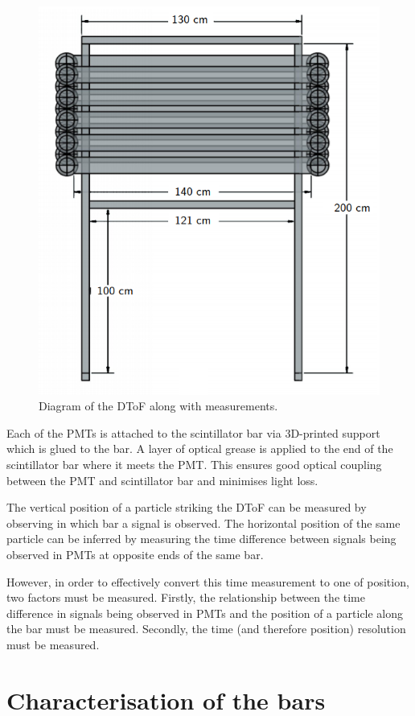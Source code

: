 \begin{figure}[h]
  \centering
  \includegraphics[width=.5\linewidth]{files/figures/hptpc_dtof_characterisation/dstofFront}
  \caption[Diagram of the HPTPC DToF]{Diagram of the DToF along with measurements.}
  \label{fig:dtofDiag}
\end{figure}

Each of the PMTs is attached to the scintillator bar via 3D-printed support which is glued to the bar.
A layer of optical grease is applied to the end of the scintillator bar where it meets the PMT.
This ensures good optical coupling between the PMT and scintillator bar and minimises light loss.

The vertical position of a particle striking the DToF can be measured by observing in which bar a signal is observed.
The horizontal position of the same particle can be inferred by measuring the time difference between signals being observed in PMTs at opposite ends of the same bar.

However, in order to effectively convert this time measurement to one of position, two factors must be measured.
Firstly, the relationship between the time difference in signals being observed in PMTs and the position of a particle along the bar must be measured.
Secondly, the time (and therefore position) resolution must be measured.

\section{Characterisation of the bars}
\label{ch:hptpc_dtof_characterisation:characterisation}




